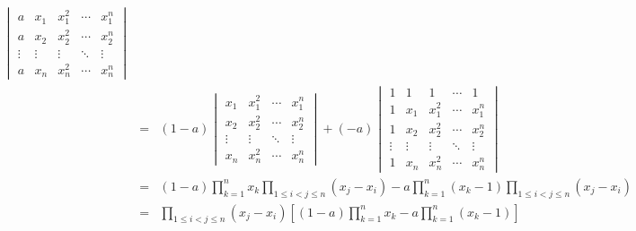 \begin{solution}
\begin{eqnarray*}
\begin{vmatrix}
			a      & x_{1}  & x_{1}^2 & \cdots & x_{1}^n \\
			a      & x_{2}  & x_{2}^2 & \cdots & x_{2}^n \\
			\vdots & \vdots & \vdots  & \ddots & \vdots \\
			a      & x_{n}  & x_{n}^2 & \cdots & x_{n}^n
		\end{vmatrix}\\
		& = & (1-a)
		\begin{vmatrix}
			x_{1}  & x_{1}^2 & \cdots & x_{1}^n\\
			x_{2}  & x_{2}^2 & \cdots & x_{2}^n\\
			\vdots & \vdots  & \ddots & \vdots\\
			x_{n}  & x_{n}^2 & \cdots & x_{n}^n
		\end{vmatrix} +
		(-a)\begin{vmatrix}
			1      & 1      & 1       & \cdots & 1 \\
			1      & x_{1}  & x_{1}^2 & \cdots & x_{1}^n\\
			1      & x_{2}  & x_{2}^2 & \cdots & x_{2}^n\\
			\vdots & \vdots & \vdots  & \ddots & \vdots\\
			1      & x_{n}  & x_{n}^2 & \cdots & x_{n}^n
		\end{vmatrix}\\
		& = & (1-a)\prod\limits_{k=1}^{n}x_{k}\prod\limits_{1\leq i<j\leq n}(x_{j}-x_{i}) - 
		a\prod\limits_{k=1}^{n}(x_{k}-1)\prod\limits_{1\leq i<j\leq n}(x_{j}-x_{i})\\
		& = & \prod\limits_{1\leq i<j\leq n}(x_{j}-x_{i})\left[ (1-a)\prod\limits_{k=1}^{n}x_{k}-a\prod\limits_{k=1}^{n}(x_{k}-1)\right]
	\end{eqnarray*}
\end{solution}

